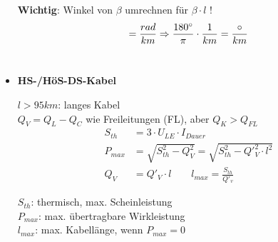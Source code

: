 \begin{itemize}
    \textbf{Wichtig}: Winkel von $\beta$ umrechnen für $\beta \cdot l$ !\\
    \begin{equation*}
    [\beta] = \frac{rad}{km} \Rightarrow \frac{180\degree}{\pi} \cdot \frac{1}{km} = \frac{\circ}{km}\\
    \end{equation*}\\
\item[] \textbf{HS-/HöS-DS-Kabel}

    $l>95km$: langes Kabel\\
    $Q_V = Q_L - Q_C$ wie Freileitungen (FL), aber $Q_K > Q_{FL}$
    \begin{align*}
        S_{th}&= 3\cdot U_{LE}\cdot I_{Dauer}\\
        P_{max}&= \sqrt{S^2_{th}-Q^2_V} = \sqrt{S^2_{th} - Q'^2_V \cdot l^2}\\
        Q_V &= Q'_V \cdot l \qquad l_{max}= \frac{S_{th}}{Q'_v}
    \end{align*}

    $S_{th}$: thermisch, max. Scheinleistung\\
    $P_{max}$: max. übertragbare Wirkleistung\\
    $l_{max}$: max. Kabellänge, wenn $P_{max} = 0$

\end{itemize}
